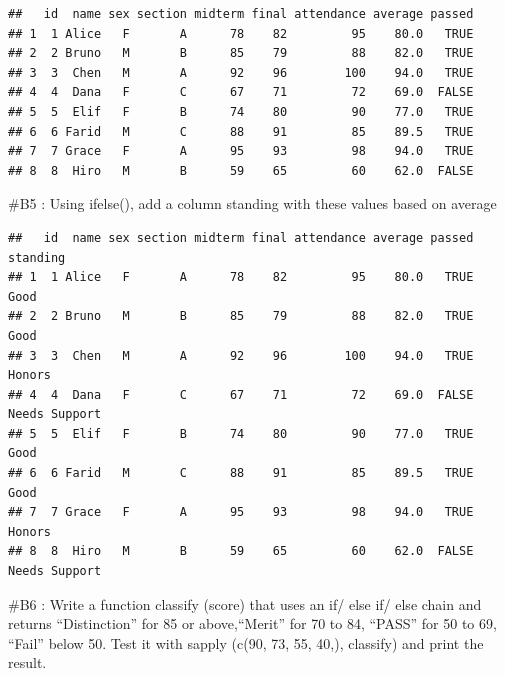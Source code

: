 \documentclass[
]{article}
\newenvironment{Shaded}{\begin{snugshade}}{\end{snugshade}}
\newcommand{\DecValTok}[1]{\textcolor[rgb]{0.00,0.00,0.81}{#1}}
\newcommand{\FunctionTok}[1]{\textcolor[rgb]{0.13,0.29,0.53}{\textbf{#1}}}
\newcommand{\NormalTok}[1]{#1}
\newcommand{\OtherTok}[1]{\textcolor[rgb]{0.56,0.35,0.01}{#1}}
\newcommand{\SpecialCharTok}[1]{\textcolor[rgb]{0.81,0.36,0.00}{\textbf{#1}}}
\newcommand{\StringTok}[1]{\textcolor[rgb]{0.31,0.60,0.02}{#1}}
\begin{document}
\begin{verbatim}
##   id  name sex section midterm final attendance average passed
## 1  1 Alice   F       A      78    82         95    80.0   TRUE
## 2  2 Bruno   M       B      85    79         88    82.0   TRUE
## 3  3  Chen   M       A      92    96        100    94.0   TRUE
## 4  4  Dana   F       C      67    71         72    69.0  FALSE
## 5  5  Elif   F       B      74    80         90    77.0   TRUE
## 6  6 Farid   M       C      88    91         85    89.5   TRUE
## 7  7 Grace   F       A      95    93         98    94.0   TRUE
## 8  8  Hiro   M       B      59    65         60    62.0  FALSE
\end{verbatim}

\#B5 : Using ifelse(), add a column standing with these values based on
average

\begin{Shaded}
\end{Shaded}

\begin{verbatim}
##   id  name sex section midterm final attendance average passed      standing
## 1  1 Alice   F       A      78    82         95    80.0   TRUE          Good
## 2  2 Bruno   M       B      85    79         88    82.0   TRUE          Good
## 3  3  Chen   M       A      92    96        100    94.0   TRUE        Honors
## 4  4  Dana   F       C      67    71         72    69.0  FALSE Needs Support
## 5  5  Elif   F       B      74    80         90    77.0   TRUE          Good
## 6  6 Farid   M       C      88    91         85    89.5   TRUE          Good
## 7  7 Grace   F       A      95    93         98    94.0   TRUE        Honors
## 8  8  Hiro   M       B      59    65         60    62.0  FALSE Needs Support
\end{verbatim}

\#B6 : Write a function classify (score) that uses an if/ else if/ else
chain and returns ``Distinction'' for 85 or above,``Merit'' for 70 to
84, ``PASS'' for 50 to 69, ``Fail'' below 50. Test it with sapply (c(90,
73, 55, 40,), classify) and print the result.
\end{document}
